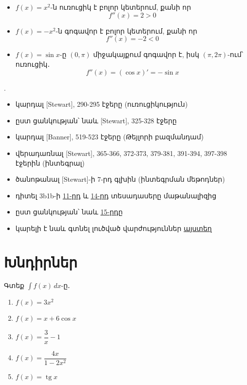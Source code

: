 \begin{example}
\\~
\begin{itemize}
\item $f(x) = x^2$-ն ուռուցիկ է բոլոր կետերում, քանի որ
\[
f''(x) = 2 > 0
\]
\item $f(x) = -x^2$-ն գոգավոր է բոլոր կետերում, քանի որ
\[
f''(x) = -2< 0
\]
\newpage
\item $f(x) = \sin x$-ը $(0, \pi)$ միջակայքում գոգավոր է, իսկ $(\pi, 2\pi)$-ում՝ ուռուցիկ․
\[
f''(x) = (\cos x)' = -\sin x
\]
\end{itemize}
\end{example}





\bigskip 

\begin{theory}
.
\begin{itemize}
\item կարդալ [{\rm Stewart}], 290-295 էջերը (ուռուցիկություն)
\item ըստ ցանկության՝ նաև [{\rm Stewart}], 325-328 էջերը
\item կարդալ [{\rm Banner}], 519-523 էջերը (Թեյլորի բազմանդամ)
\item վերադառնալ [{\rm Stewart}], 365-366, 372-373, 379-381, 391-394, 397-398 էջերին (ինտեգրալ)
\item ծանոթանալ [{\rm Stewart}]-ի 7-րդ գլխին (ինտեգրման մեթոդներ)
\item դիտել  {\rm 3b1b}-ի \href{https://www.3blue1brown.com/lessons/integration}{11-րդ} և \href{https://www.3blue1brown.com/lessons/taylor-series}{14-րդ} տեսադասերը մաթանալիզից 
\item ըստ ցանկության՝ նաև \href{https://www.3blue1brown.com/lessons/taylor-series-geometric-view}{15-րդը}
\item կարելի է նաև գտնել լուծված վարժություններ \href{https://tutorial.math.lamar.edu/Classes/CalcI/CalcI.aspx}{այստեղ}
\end{itemize}
\end{theory}

\newpage

\section{Խնդիրներ}


\begin{problem}
Գտեք $\displaystyle \int f(x)\, dx$-ը․
\begin{enumerate}[label={\alph*}․]
\item $f(x)=3x^2$
\item $f(x)=x+6\cos x$
\item $f(x)=\dfrac{3}{x}-1$
\item $f(x)=\dfrac{4x}{1-2x^2}$
\item $f(x)=\operatorname{tg}x$
\end{enumerate}
\end{problem}


